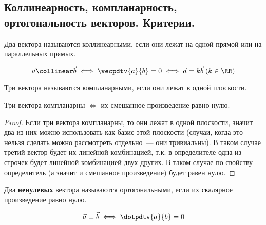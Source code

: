 \subsection{%
  Коллинеарность, компланарность, ортогональность векторов. Критерии.%
}

\begin{definition}
  Два вектора называются коллинеарными, если они лежат на одной прямой или на
  параллельных прямых.
\end{definition}

\begin{theorem}
  \begin{equation*}
    \vec{a} \collinear \vec{b}
    \iff \vecpdtv{a}{b} = 0
    \iff \vec{a} = k \vec{b} \; (k \in \RR)
  \end{equation*}
\end{theorem}

\begin{definition}
  Три вектора называются компланарными, если они лежат в одной плоскости.
\end{definition}

\begin{theorem}
  Три вектора компланарны \(\iff\) их смешанное произведение равно нулю.
\end{theorem}

\begin{proof}
  Если три вектора компланарны, то они лежат в одной плоскости, значит два из
  них можно использовать как базис этой плоскости (случаи, когда это нельзя
  сделать  можно рассмотреть отдельно~--- они тривиальны). В таком случае третий
  вектор будет их линейной комбинацией, т.к. в определителе одна из строчек
  будет линейной комбинацией двух других. В таком случае по свойству
  определитель (а значит и смешанное произведение) будет равен нулю.
\end{proof}

\begin{definition}
  Два \textbf{ненулевых} вектора называются ортогональными, если их скалярное
  произведение равно нулю.
  
  \begin{equation*}
    \vec{a} \perp \vec{b} \iff \dotpdtv{a}{b} = 0
  \end{equation*}
\end{definition}
